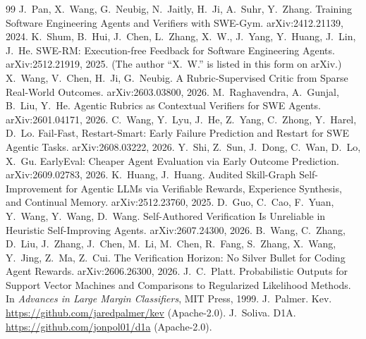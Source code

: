 \documentclass[11pt]{article}
\begin{document}
\sloppy
\begin{thebibliography}{99}\small
{} J.~Pan, X.~Wang, G.~Neubig, N.~Jaitly, H.~Ji, A.~Suhr, Y.~Zhang. Training Software Engineering Agents and Verifiers with SWE-Gym. arXiv:2412.21139, 2024.
 K.~Shum, B.~Hui, J.~Chen, L.~Zhang, X.~W., J.~Yang, Y.~Huang, J.~Lin, J.~He. SWE-RM: Execution-free Feedback for Software Engineering Agents. arXiv:2512.21919, 2025. (The author ``X.~W.'' is listed in this form on arXiv.)
 X.~Wang, V.~Chen, H.~Ji, G.~Neubig. A Rubric-Supervised Critic from Sparse Real-World Outcomes. arXiv:2603.03800, 2026.
 M.~Raghavendra, A.~Gunjal, B.~Liu, Y.~He. Agentic Rubrics as Contextual Verifiers for SWE Agents. arXiv:2601.04171, 2026.
 C.~Wang, Y.~Lyu, J.~He, Z.~Yang, C.~Zhong, Y.~Harel, D.~Lo. Fail-Fast, Restart-Smart: Early Failure Prediction and Restart for SWE Agentic Tasks. arXiv:2608.03222, 2026.
 Y.~Shi, Z.~Sun, J.~Dong, C.~Wan, D.~Lo, X.~Gu. EarlyEval: Cheaper Agent Evaluation via Early Outcome Prediction. arXiv:2609.02783, 2026.
 K.~Huang, J.~Huang. Audited Skill-Graph Self-Improvement for Agentic LLMs via Verifiable Rewards, Experience Synthesis, and Continual Memory. arXiv:2512.23760, 2025.
 D.~Guo, C.~Cao, F.~Yuan, Y.~Wang, Y.~Wang, D.~Wang. Self-Authored Verification Is Unreliable in Heuristic Self-Improving Agents. arXiv:2607.24300, 2026.
 B.~Wang, C.~Zhang, D.~Liu, J.~Zhang, J.~Chen, M.~Li, M.~Chen, R.~Fang, S.~Zhang, X.~Wang, Y.~Jing, Z.~Ma, Z.~Cui. The Verification Horizon: No Silver Bullet for Coding Agent Rewards. arXiv:2606.26300, 2026.
 J.~C.~Platt. Probabilistic Outputs for Support Vector Machines and Comparisons to Regularized Likelihood Methods. In \emph{Advances in Large Margin Classifiers}, MIT Press, 1999.
 J.~Palmer. Kev. \url{https://github.com/jaredpalmer/kev} (Apache-2.0).
 J.~Soliva. D1A. \url{https://github.com/jonpol01/d1a} (Apache-2.0).
\end{thebibliography}
\end{document}
